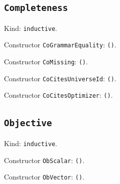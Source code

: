 \documentclass[11pt]{article}
\begin{document}
\subsection*{\texttt{Completeness}}
\noindent Kind: \texttt{inductive}.\par
\noindent Constructor \texttt{CoGrammarEquality}: \texttt{()}.\par
\noindent Constructor \texttt{CoMissing}: \texttt{()}.\par
\noindent Constructor \texttt{CoCitesUniverseId}: \texttt{()}.\par
\noindent Constructor \texttt{CoCitesOptimizer}: \texttt{()}.\par
\subsection*{\texttt{Objective}}
\noindent Kind: \texttt{inductive}.\par
\noindent Constructor \texttt{ObScalar}: \texttt{()}.\par
\noindent Constructor \texttt{ObVector}: \texttt{()}.\par
\end{document}
